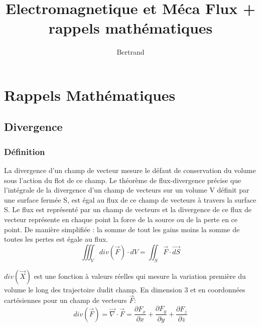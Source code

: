 \documentclass[10pt,a4paper]{article}
\author{Bertrand}
\title{Electromagnetique et Méca Flux + rappels mathématiques}
\begin{document}

\maketitle
\tableofcontents
\newpage


\section{Rappels Mathématiques}

\subsection{Divergence \cite{divergence}}
\subsubsection{Définition}
La divergence d'un champ de vecteur mesure le défaut de conservation du volume sous l'action du flot de ce champ. Le théorème de flux-divergence \cite{fluxdiv} précise que l'intégrale de la divergence d'un champ de vecteurs sur un volume V définit par une surface fermée S, est égal au flux de ce champ de vecteurs à travers la surface S. Le flux est représenté par un champ de vecteurs et la divergence de ce flux de vecteur représente en chaque point la force de la source ou de la perte en ce point. De manière simplifiée : la somme de tout les gains moins la somme de toutes les pertes est égale au flux. 
\begin{equation}
\iiint_{V}div(\overrightarrow{F})\cdot dV = \iint_{S}\overrightarrow{F}\cdot \overrightarrow{dS}
\end{equation}

$div(\overrightarrow{X})$ est une fonction à valeurs réelles qui mesure la variation première du volume le long des trajectoire dudit champ.
En dimension 3 et en coordonnées cartésiennes pour un champ de vecteurs $\overrightarrow{F}$:
\begin{equation}
div(\overrightarrow{F}) = \overrightarrow{\nabla}\cdot\overrightarrow{F}= \frac{\partial F_{x}}{\partial x} + \frac{\partial F_{y}}{\partial y} + \frac{\partial F_{z}}{\partial z}
\end{equation}
\end{document}
